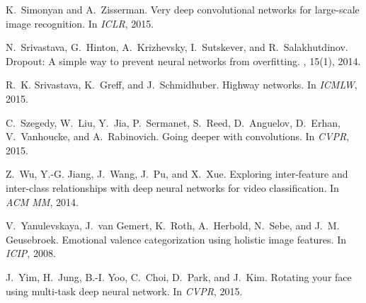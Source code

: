 \documentclass{sig-alternate-05-2015}
\begin{document}
\begin{thebibliography}{10}
K.~Simonyan and A.~Zisserman.
\newblock Very deep convolutional networks for large-scale image recognition.
\newblock In {\em ICLR}, 2015.

N.~Srivastava, G.~Hinton, A.~Krizhevsky, I.~Sutskever, and R.~Salakhutdinov.
\newblock Dropout: {A} simple way to prevent neural networks from overfitting.
, 15(1), 2014.

R.~K. Srivastava, K.~Greff, and J.~Schmidhuber.
\newblock Highway networks.
\newblock In {\em ICMLW}, 2015.

C.~Szegedy, W.~Liu, Y.~Jia, P.~Sermanet, S.~Reed, D.~Anguelov, D.~Erhan,
  V.~Vanhoucke, and A.~Rabinovich.
\newblock Going deeper with convolutions.
\newblock In {\em CVPR}, 2015.

Z.~Wu, Y.-G. Jiang, J.~Wang, J.~Pu, and X.~Xue.
\newblock Exploring inter-feature and inter-class relationships with deep
  neural networks for video classification.
\newblock In {\em ACM MM}, 2014.

V.~Yanulevskaya, J.~van Gemert, K.~Roth, A.~Herbold, N.~Sebe, and J.~M.
  Geusebroek.
\newblock Emotional valence categorization using holistic image features.
\newblock In {\em ICIP}, 2008.

J.~Yim, H.~Jung, B.-I. Yoo, C.~Choi, D.~Park, and J.~Kim.
\newblock Rotating your face using multi-task deep neural network.
\newblock In {\em CVPR}, 2015.

\end{thebibliography}

%

\end{document}
